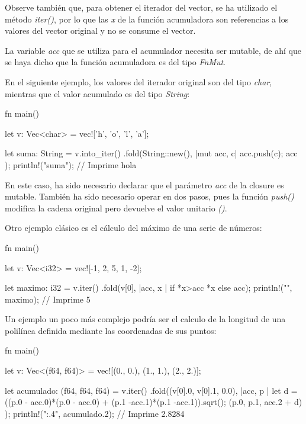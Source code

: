 Observe también que, para obtener el iterador del vector, se ha utilizado el método \textit{iter()}, por lo que las \textit{x} de la función acumuladora son referencias a los valores del vector original y no se consume el vector.

La variable \textit{acc} que se utiliza para el acumulador necesita ser mutable, de ahí que se haya dicho que la función acumuladora es del tipo \textit{FnMut}.

En el siguiente ejemplo, los valores del iterador original son del tipo \textit{char}, mientras que el valor acumulado es del tipo \textit{String}:

\vspace{0.7em}
\begin{Codigo}
   fn main() {
      let v: Vec<char> = vec!['h', 'o', 'l', 'a'];
      
      let suma: String = v.into_iter()
      .fold(String::new(), |mut acc, c| {
         acc.push(c);
         acc
      }
      );
      println!("{suma}"); // Imprime hola
   }
\end{Codigo}

En este caso, ha sido necesario declarar que el parámetro \textit{acc} de la closure es mutable. También ha sido necesario operar en dos pasos, pues la función \textit{push()} modifica la cadena original pero devuelve el valor unitario \textit{()}.

Otro ejemplo clásico es el cálculo del máximo de una serie de números:

\vspace{0.7em}
\begin{Codigo}
   fn main() {
      let v: Vec<i32> = vec![-1, 2, 5, 1, -2];
      
      let maximo: i32 = v.iter()
      .fold(v[0], |acc, x | if *x>acc {*x} else {acc});
      println!("{}", maximo); // Imprime 5
   }
\end{Codigo}

Un ejemplo un poco más complejo podría ser el calculo de la longitud de una polilínea definida mediante las coordenadas de sus puntos:

\vspace{0.7em}
\begin{Codigo}
   fn main() {
      let v: Vec<(f64, f64)> = vec![(0., 0.), (1., 1.), (2., 2.)];
      
      let acumulado: (f64, f64, f64) = v.iter()
      .fold((v[0].0, v[0].1, 0.0), |acc, p |{
         let d = ((p.0 - acc.0)*(p.0 - acc.0) + 
         (p.1 -acc.1)*(p.1 -acc.1)).sqrt();
         (p.0, p.1, acc.2 + d)
      }
      );
      println!("{:.4}", acumulado.2); // Imprime 2.8284
   }
\end{Codigo}

